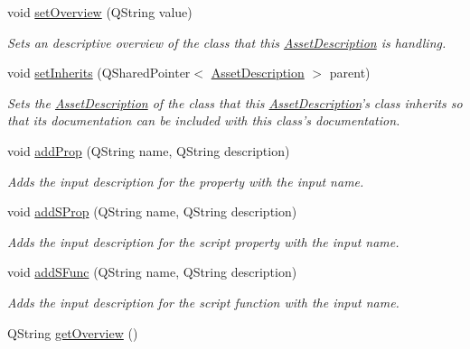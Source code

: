 \begin{DoxyCompactItemize}
\item 
\hypertarget{struct_asset_description_a2771424bfad23578b8f29db24517c52e}{void \hyperlink{struct_asset_description_a2771424bfad23578b8f29db24517c52e}{set\-Overview} (Q\-String value)}\label{struct_asset_description_a2771424bfad23578b8f29db24517c52e}

\begin{DoxyCompactList}\small\item\em Sets an descriptive overview of the class that this \hyperlink{struct_asset_description}{Asset\-Description} is handling. \end{DoxyCompactList}\item 
\hypertarget{struct_asset_description_a42a37f80680d85efdb30a920f141a74d}{void \hyperlink{struct_asset_description_a42a37f80680d85efdb30a920f141a74d}{set\-Inherits} (Q\-Shared\-Pointer$<$ \hyperlink{struct_asset_description}{Asset\-Description} $>$ parent)}\label{struct_asset_description_a42a37f80680d85efdb30a920f141a74d}

\begin{DoxyCompactList}\small\item\em Sets the \hyperlink{struct_asset_description}{Asset\-Description} of the class that this \hyperlink{struct_asset_description}{Asset\-Description}'s class inherits so that its documentation can be included with this class's documentation. \end{DoxyCompactList}\item 
void \hyperlink{struct_asset_description_a25e49a1ea7772e717a15838669d3f66f}{add\-Prop} (Q\-String name, Q\-String description)
\begin{DoxyCompactList}\small\item\em Adds the input description for the property with the input name. \end{DoxyCompactList}\item 
void \hyperlink{struct_asset_description_a9132d9f5eaa726bd11d72b56acb2588f}{add\-S\-Prop} (Q\-String name, Q\-String description)
\begin{DoxyCompactList}\small\item\em Adds the input description for the script property with the input name. \end{DoxyCompactList}\item 
void \hyperlink{struct_asset_description_a0af60dba4faf9ce440881bc4c3f2e480}{add\-S\-Func} (Q\-String name, Q\-String description)
\begin{DoxyCompactList}\small\item\em Adds the input description for the script function with the input name. \end{DoxyCompactList}\item 
\hypertarget{struct_asset_description_a6b0d095f270d2ef32628a6f0a12e356c}{Q\-String \hyperlink{struct_asset_description_a6b0d095f270d2ef32628a6f0a12e356c}{get\-Overview} ()}\label{struct_asset_description_a6b0d095f270d2ef32628a6f0a12e356c}


\end{DoxyCompactItemize}
